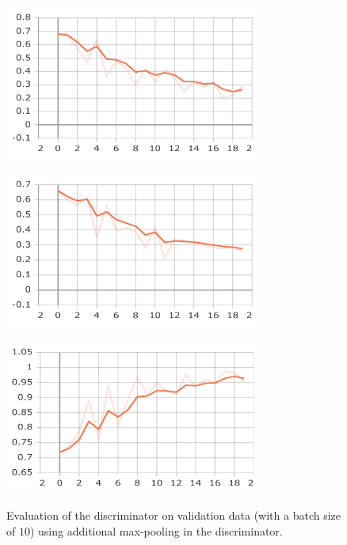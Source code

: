 \begin{figure}[htbp]
	\centering
	\begin{minipage}{0.8\textwidth}
		\centering
		\includegraphics[width=0.75\textwidth]{Sources/Results/pooling/plots_pdf/epoch_VALIDATION_D_fake_loss.pdf}
		\label{fig:4a}
	\end{minipage}%
	
	\begin{minipage}{0.8\textwidth}
		\centering
		\includegraphics[width=0.75\textwidth]{Sources/Results/pooling/plots_pdf/epoch_VALIDATION_D_real_loss.pdf}
		\label{fig:4b}
	\end{minipage}%
	
	\begin{minipage}{0.8\textwidth}
		\centering
		\includegraphics[width=0.75\textwidth]{Sources/Results/pooling/plots_pdf/epoch_VALIDATION_D_fake_acc.pdf}
		\label{fig:4c}
	\end{minipage}%
	
	\caption{Evaluation of the discriminator on validation data (with a batch size of $10$) using additional max-pooling in the discriminator.} \label{fig:4}
\end{figure}

